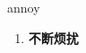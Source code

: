 
\begin{frame}
{\huge annoy}
\begin{center}
\begin{enumerate}\Large
  \item \textbf{不断烦扰}
\end{enumerate}
\end{center}
\end{frame}
